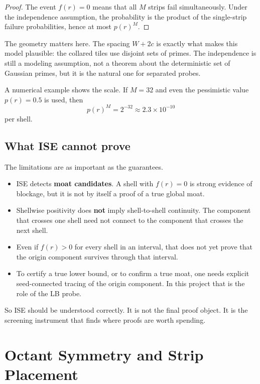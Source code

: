 \documentclass[12pt,letterpaper]{article}
\theoremstyle{definition}
\theoremstyle{remark}
\begin{document}
\begin{proof}
The event $f(r)=0$ means that all $M$ strips fail simultaneously. Under the independence assumption, the probability is the product of the single-strip failure probabilities, hence at most $p(r)^M$.
\end{proof}

The geometry matters here. The spacing $W+2c$ is exactly what makes this model plausible: the collared tiles use disjoint sets of primes. The independence is still a modeling assumption, not a theorem about the deterministic set of Gaussian primes, but it is the natural one for separated probes.

A numerical example shows the scale. If $M=32$ and even the pessimistic value $p(r)=0.5$ is used, then
\[
p(r)^M = 2^{-32}\approx 2.3\times 10^{-10}
\]
per shell.

\subsection{What ISE cannot prove}

The limitations are as important as the guarantees.

\begin{itemize}
\item ISE detects \textbf{moat candidates}. A shell with $f(r)=0$ is strong evidence of blockage, but it is not by itself a proof of a true global moat.
\item Shellwise positivity does \textbf{not} imply shell-to-shell continuity. The component that crosses one shell need not connect to the component that crosses the next shell.
\item Even if $f(r)>0$ for every shell in an interval, that does not yet prove that the origin component survives through that interval.
\item To certify a true lower bound, or to confirm a true moat, one needs explicit seed-connected tracing of the origin component. In this project that is the role of the LB probe.
\end{itemize}

So ISE should be understood correctly. It is not the final proof object. It is the screening instrument that finds where proofs are worth spending.

\section{Octant Symmetry and Strip Placement}
\end{document}
